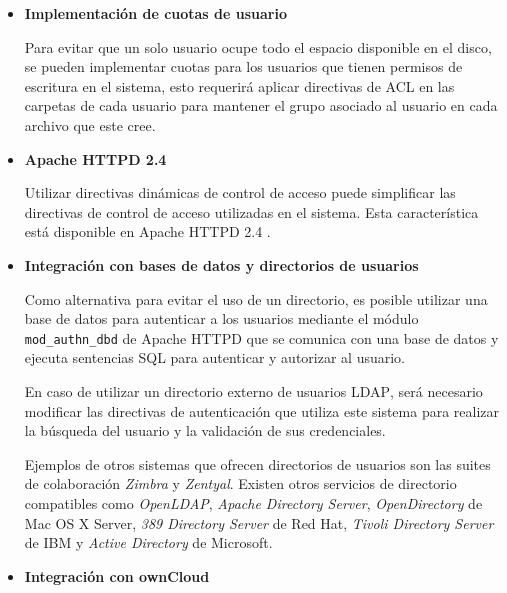 \begin{itemize}
  \item \textbf{Implementaci\'{o}n de cuotas de usuario}

Para evitar que un solo usuario ocupe todo el espacio disponible en el disco, se pueden implementar cuotas para los usuarios que tienen permisos de escritura en el sistema, esto requerir\'{a} aplicar directivas de \textsc{ACL} en las carpetas de cada usuario para mantener el grupo asociado al usuario en cada archivo que este cree. 

  \item \textbf{Apache HTTPD 2.4}

Utilizar directivas din\'{a}micas de control de acceso puede simplificar las directivas de control de acceso utilizadas en el sistema. Esta caracter\'{i}stica est\'{a} disponible en Apache \textsc{HTTPD} 2.4 \cite{_mod_authz_core_????} \cite{_mod_authnz_ldap_????}.

  \item \textbf{Integraci\'{o}n con bases de datos y directorios de usuarios}


Como alternativa para evitar el uso de un directorio, es posible utilizar una base de datos para autenticar a los usuarios mediante el m\'{o}dulo \texttt{mod\_authn\_dbd} de Apache \textsc{HTTPD} que se comunica con una base de datos y ejecuta sentencias \textsc{SQL} para autenticar y autorizar al usuario.

En caso de utilizar un directorio externo de usuarios \textsc{LDAP}, ser\'{a} necesario modificar las directivas de autenticaci\'{o}n que utiliza este sistema para realizar la b\'{u}squeda del usuario y la validaci\'{o}n de sus credenciales.

Ejemplos de otros sistemas que ofrecen directorios de usuarios son las suites de colaboraci\'{o}n \textsl{Zimbra} y \textsl{Zentyal}.  Existen otros servicios de directorio compatibles como \textit{OpenLDAP}, \textit{Apache Directory Server}, \textit{OpenDirectory} de Mac OS X Server, \textit{389 Directory Server} de Red Hat, \textit{Tivoli Directory Server} de IBM y \textit{Active Directory} de Microsoft.

  \item \textbf{Integraci\'{o}n con ownCloud}


\end{itemize}
